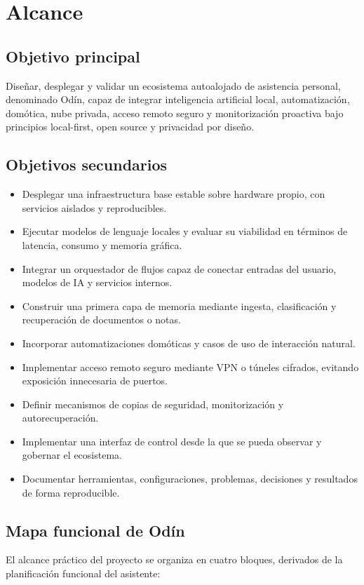 \chapter{Alcance}

\section{Objetivo principal}
Diseñar, desplegar y validar un ecosistema autoalojado de asistencia personal, denominado Odín, capaz de integrar inteligencia artificial local, automatización, domótica, nube privada, acceso remoto seguro y monitorización proactiva bajo principios local-first, open source y privacidad por diseño.

\section{Objetivos secundarios}
\begin{itemize}
  \item Desplegar una infraestructura base estable sobre hardware propio, con servicios aislados y reproducibles.
  \item Ejecutar modelos de lenguaje locales y evaluar su viabilidad en términos de latencia, consumo y memoria gráfica.
  \item Integrar un orquestador de flujos capaz de conectar entradas del usuario, modelos de IA y servicios internos.
  \item Construir una primera capa de memoria mediante ingesta, clasificación y recuperación de documentos o notas.
  \item Incorporar automatizaciones domóticas y casos de uso de interacción natural.
  \item Implementar acceso remoto seguro mediante VPN o túneles cifrados, evitando exposición innecesaria de puertos.
  \item Definir mecanismos de copias de seguridad, monitorización y autorecuperación.
  \item Implementar una interfaz de control desde la que se pueda observar y gobernar el ecosistema.
  \item Documentar herramientas, configuraciones, problemas, decisiones y resultados de forma reproducible.
\end{itemize}

\section{Mapa funcional de Odín}
El alcance práctico del proyecto se organiza en cuatro bloques, derivados de la planificación funcional del asistente:

